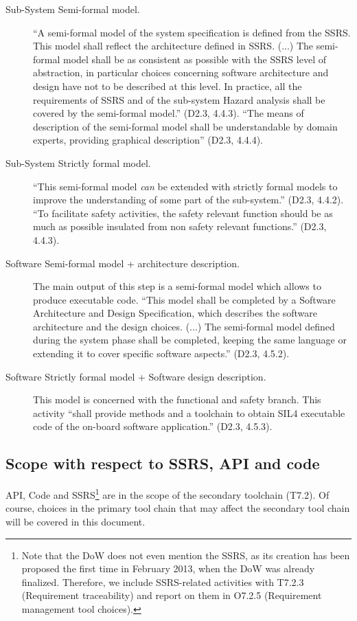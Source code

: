 \begin{description}
  \item [Sub-System Semi-formal model.]  ``A semi-formal model of the system specification is defined from the SSRS. This model shall reflect the architecture defined in SSRS. (...) The semi-formal model shall be as consistent as possible with the SSRS level of abstraction, in particular choices concerning
software architecture and design have not to be described at this level. In practice, all the requirements of SSRS and of the sub-system Hazard analysis shall be covered by the semi-formal model.'' (D2.3, 4.4.3).  ``The means of description of the semi-formal model shall be understandable by domain experts, providing graphical description'' (D2.3, 4.4.4).

  \item [Sub-System Strictly formal model.] ``This semi-formal model \emph{can} be extended with strictly formal models to improve the understanding of some part of the sub-system.'' (D2.3, 4.4.2).  ``To facilitate safety activities, the safety relevant function should be as much as possible insulated from non safety relevant functions.'' (D2.3, 4.4.3).

  \item [Software Semi-formal model + architecture description.] The main output of this step is a semi-formal model which allows to produce executable code. ``This model shall be completed by a Software Architecture and Design Specification, which describes the software architecture and the design choices. (...) The semi-formal model defined during the system phase shall be completed, keeping the same language or extending it to cover specific software aspects.'' (D2.3, 4.5.2).

  \item [Software Strictly formal model + Software design description.]  This model is concerned with the functional and safety branch.  This activity ``shall provide methods and a toolchain to obtain SIL4 executable code of the on-board software application.'' (D2.3, 4.5.3).

\end{description}

\subsection{Scope with respect to SSRS, API and code}

API, Code and SSRS\footnote{Note that the DoW does not even mention the SSRS, as its creation has been proposed the first time in February 2013, when the DoW was already finalized.  Therefore, we include SSRS-related activities with T7.2.3 (Requirement traceability) and report on them in O7.2.5 (Requirement management tool choices).}  are in the scope of the secondary toolchain (T7.2).  Of course, choices in the primary tool chain that may affect the secondary tool chain will be covered in this document.


